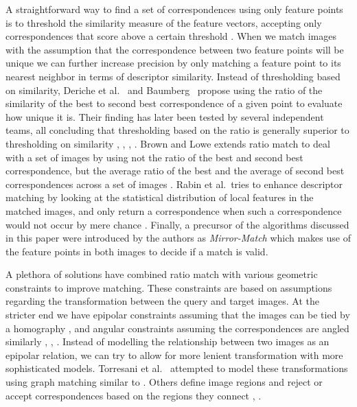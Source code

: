 \documentclass[journal]{IEEEtran}
\begin{document}
A straightforward way to find a set of correspondences using only 
feature points is to threshold the similarity measure of the feature 
vectors, accepting only correspondences that score above a certain 
threshold \cite{szeliski2010}. When we match images with the assumption 
that the correspondence between two feature points will be unique we can 
further increase precision by only matching a feature point to its 
nearest neighbor in terms of descriptor similarity. Instead of 
thresholding based on similarity, Deriche et 
al.~\cite{deriche1994robust} and Baumberg~\cite{baumberg2000reliable} 
propose using the ratio of the similarity of the best to second best 
correspondence of a given point to evaluate how unique it is. Their 
finding has later been tested by several independent teams, all 
concluding that thresholding based on the ratio is generally superior to 
thresholding on similarity \cite{lowe2004sift}, 
\cite{mikolajczyk2005performance}, \cite{moreels2007evaluation}, 
\cite{rabin2009statistical}. Brown and Lowe extends ratio match to deal 
with a set of images by using not the ratio of the best and second best 
correspondence, but the average ratio of the best and the average of 
second best correspondences across a set of images 
\cite{brown2005multi}.  Rabin et al.\ tries to enhance descriptor 
matching by looking at the statistical distribution of local features in 
the matched images, and only return a correspondence when such a 
correspondence would not occur by mere chance 
\cite{rabin2009statistical}. Finally, a precursor of the algorithms 
discussed in this paper were introduced by the authors as 
\emph{Mirror-Match} \cite{arnfred2013mirror} which makes use of the 
feature points in both images to decide if a match is valid.

A plethora of solutions have combined ratio match with various geometric 
constraints to improve matching. These constraints are
based on assumptions regarding the transformation between the query and 
target images. At the stricter end we have epipolar constraints assuming
that the images can be tied by a homography \cite{torr2000mlesac}, 
\cite{chum2005matching} and angular constraints assuming the 
correspondences are angled similarly \cite{kim2008efficient}, 
\cite{schmid1997local}, \cite{leordeanu2005spectral}. Instead of 
modelling the relationship between two images as an epipolar relation, 
we can try to allow for more lenient transformation with more 
sophisticated models.  Torresani et al.~\cite{torresani2008feature} 
attempted to model these transformations using graph matching similar to 
\cite{deriche1994robust}. Others define image regions and reject or 
accept correspondences based on the regions they connect 
\cite{cho2009feature}, \cite{wu2011robust}.
\end{document}
